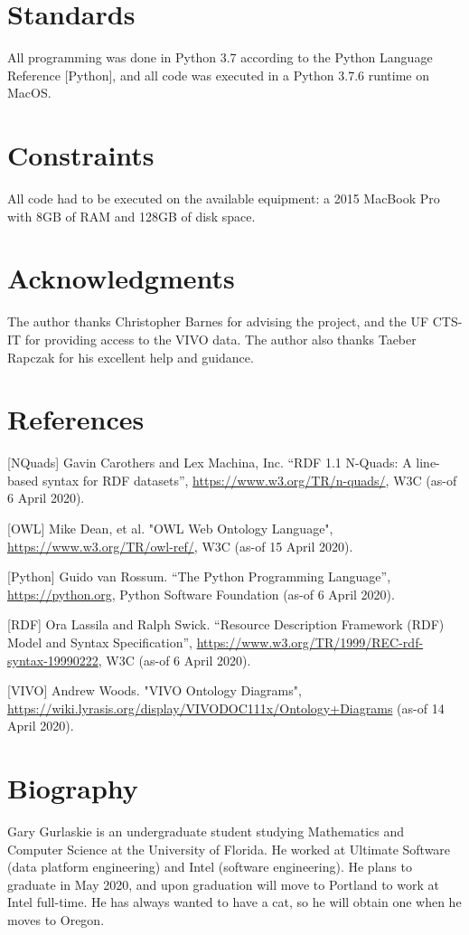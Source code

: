 \documentclass[11pt]{article}
\begin{document}
\section*{Standards}
All programming was done in Python 3.7 according to the Python Language Reference [Python], and all code was executed in a Python 3.7.6 runtime on MacOS.

\section*{Constraints}
All code had to be executed on the available equipment: a 2015 MacBook Pro with 8GB of RAM and 128GB of disk space. 

% 

\section*{Acknowledgments}
The author thanks Christopher Barnes for advising the project, and the UF CTS-IT for providing access to the VIVO data. The author also thanks Taeber Rapczak for his excellent help and guidance.

\section*{References}

[NQuads] Gavin Carothers and Lex Machina, Inc. “RDF 1.1 N-Quads: A line-based syntax for RDF datasets”, \url{https://www.w3.org/TR/n-quads/}, W3C (as-of 6 April 2020).

[OWL] Mike Dean, et al. "OWL Web Ontology Language", \url{https://www.w3.org/TR/owl-ref/}, W3C (as-of 15 April 2020).

[Python] Guido van Rossum. “The Python Programming Language”, \url{https://python.org}, Python Software Foundation (as-of 6 April 2020).

[RDF] Ora Lassila and Ralph Swick. “Resource Description Framework (RDF) Model and Syntax Specification”, \url{https://www.w3.org/TR/1999/REC-rdf-syntax-19990222}, W3C (as-of 6 April 2020).

[VIVO] Andrew Woods. "VIVO Ontology Diagrams", \url{https://wiki.lyrasis.org/display/VIVODOC111x/Ontology+Diagrams} (as-of 14 April 2020).

\section*{Biography}
Gary Gurlaskie is an undergraduate student studying Mathematics and Computer Science at the University of Florida. He worked at Ultimate Software (data platform engineering) and Intel (software engineering). He plans to graduate in May 2020, and upon graduation will move to Portland to work at Intel full-time. He has always wanted to have a cat, so he will obtain one when he moves to Oregon.
\end{document}
